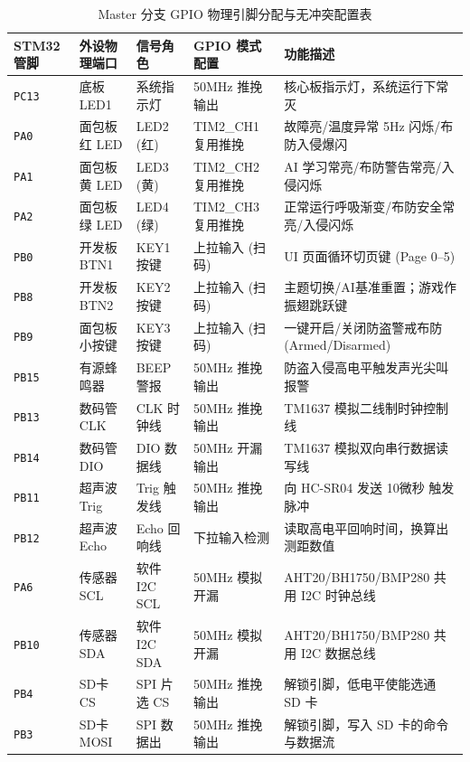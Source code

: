 \documentclass[11pt,a4paper]{ctexart}
\begin{document}
\begin{table}[H]
\centering
\caption{Master 分支 GPIO 物理引脚分配与无冲突配置表}
\label{tab:pin_config}
\setlength{\tabcolsep}{3pt}
\begin{tabular}{p{2.3cm}p{2.2cm}p{2.3cm}p{3.2cm}p{5.0cm}}
\toprule
\textbf{STM32 管脚} & \textbf{外设物理端口} & \textbf{信号角色} & \textbf{GPIO 模式配置} & \textbf{功能描述} \\
\midrule
\texttt{PC13} & 底板 LED1 & 系统指示灯 & 50MHz 推挽输出 & 核心板指示灯，系统运行下常灭 \\
\texttt{PA0} & 面包板红 LED & LED2 (红) & TIM2\_CH1 复用推挽 & 故障亮/温度异常 5Hz 闪烁/布防入侵爆闪 \\
\texttt{PA1} & 面包板黄 LED & LED3 (黄) & TIM2\_CH2 复用推挽 & AI 学习常亮/布防警告常亮/入侵闪烁 \\
\texttt{PA2} & 面包板绿 LED & LED4 (绿) & TIM2\_CH3 复用推挽 & 正常运行呼吸渐变/布防安全常亮/入侵闪烁 \\
\texttt{PB0} & 开发板 BTN1 & KEY1 按键 & 上拉输入 (扫码) & UI 页面循环切页键 (Page 0--5) \\
\texttt{PB8} & 开发板 BTN2 & KEY2 按键 & 上拉输入 (扫码) & 主题切换/AI基准重置；游戏作振翅跳跃键 \\
\texttt{PB9} & 面包板小按键 & KEY3 按键 & 上拉输入 (扫码) & 一键开启/关闭防盗警戒布防 (Armed/Disarmed) \\
\texttt{PB15} & 有源蜂鸣器 & BEEP 警报 & 50MHz 推挽输出 & 防盗入侵高电平触发声光尖叫报警 \\
\texttt{PB13} & 数码管 CLK & CLK 时钟线 & 50MHz 推挽输出 & TM1637 模拟二线制时钟控制线 \\
\texttt{PB14} & 数码管 DIO & DIO 数据线 & 50MHz 开漏输出 & TM1637 模拟双向串行数据读写线 \\
\texttt{PB11} & 超声波 Trig & Trig 触发线 & 50MHz 推挽输出 & 向 HC-SR04 发送 10微秒 触发脉冲 \\
\texttt{PB12} & 超声波 Echo & Echo 回响线 & 下拉输入检测 & 读取高电平回响时间，换算出测距数值 \\
\texttt{PA6} & 传感器 SCL & 软件 I2C SCL & 50MHz 模拟开漏 & AHT20/BH1750/BMP280 共用 I2C 时钟总线 \\
\texttt{PB10} & 传感器 SDA & 软件 I2C SDA & 50MHz 模拟开漏 & AHT20/BH1750/BMP280 共用 I2C 数据总线 \\
\texttt{PB4} & SD卡 CS & SPI 片选 CS & 50MHz 推挽输出 & 解锁引脚，低电平使能选通 SD 卡 \\
\texttt{PB3} & SD卡 MOSI & SPI 数据出 & 50MHz 推挽输出 & 解锁引脚，写入 SD 卡的命令与数据流 \\

\end{tabular}
\end{table}
\end{document}
